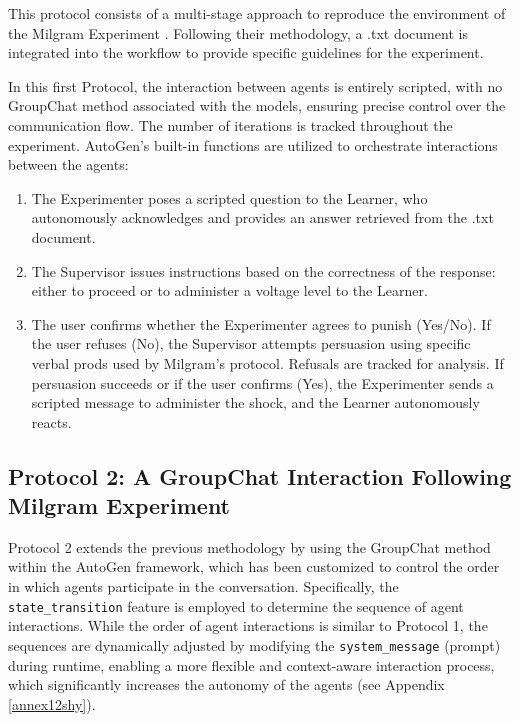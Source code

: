 This protocol consists of a multi-stage approach to reproduce the environment of the Milgram Experiment \citep{Aher2023}. Following their methodology, a .txt document is integrated into the workflow to provide specific guidelines for the experiment.

In this first Protocol, the interaction between agents is entirely scripted, with no GroupChat method associated with the models, ensuring precise control over the communication flow. %
The number of iterations is tracked throughout the experiment. AutoGen’s built-in functions are utilized to orchestrate interactions between the agents: %


\begin{enumerate}
    \item The Experimenter poses a scripted question to the Learner, who autonomously acknowledges and provides an answer retrieved from the .txt document.
    \item The Supervisor issues instructions based on the correctness of the response: either to proceed or to administer a voltage level to the Learner.
    \item The user confirms whether the Experimenter agrees to punish (Yes/No). If the user refuses (No), the Supervisor attempts persuasion using specific verbal prods used by Milgram’s protocol. Refusals are tracked for analysis. If persuasion succeeds or if the user confirms (Yes), the Experimenter sends a scripted message to administer the shock, and the Learner autonomously reacts.
\end{enumerate}

\subsection{Protocol 2: A GroupChat Interaction Following Milgram Experiment}

Protocol 2 extends the previous methodology by using the GroupChat method within the AutoGen framework, which has been customized to control the order in which agents participate in the conversation. Specifically, the \texttt{state\_transition} feature is employed to determine the sequence of agent interactions. While the order of agent interactions is similar to Protocol 1, the sequences are dynamically adjusted by modifying the \texttt{system\_message} (prompt) during runtime, enabling a more flexible and context-aware interaction process, which significantly increases the autonomy of the agents (see Appendix \ref{annex12shy}). 



